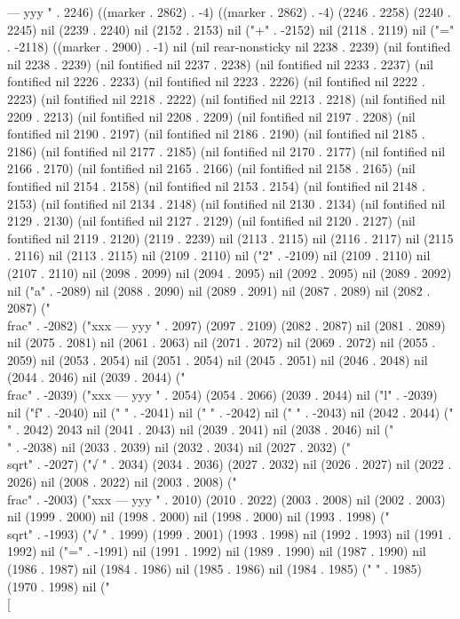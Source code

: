---
yyy
" . 2246) ((marker . 2862) . -4) ((marker . 2862) . -4) (2246 . 2258) (2240 . 2245) nil (2239 . 2240) nil (2152 . 2153) nil ("+" . -2152) nil (2118 . 2119) nil ("=" . -2118) ((marker . 2900) . -1) nil (nil rear-nonsticky nil 2238 . 2239) (nil fontified nil 2238 . 2239) (nil fontified nil 2237 . 2238) (nil fontified nil 2233 . 2237) (nil fontified nil 2226 . 2233) (nil fontified nil 2223 . 2226) (nil fontified nil 2222 . 2223) (nil fontified nil 2218 . 2222) (nil fontified nil 2213 . 2218) (nil fontified nil 2209 . 2213) (nil fontified nil 2208 . 2209) (nil fontified nil 2197 . 2208) (nil fontified nil 2190 . 2197) (nil fontified nil 2186 . 2190) (nil fontified nil 2185 . 2186) (nil fontified nil 2177 . 2185) (nil fontified nil 2170 . 2177) (nil fontified nil 2166 . 2170) (nil fontified nil 2165 . 2166) (nil fontified nil 2158 . 2165) (nil fontified nil 2154 . 2158) (nil fontified nil 2153 . 2154) (nil fontified nil 2148 . 2153) (nil fontified nil 2134 . 2148) (nil fontified nil 2130 . 2134) (nil fontified nil 2129 . 2130) (nil fontified nil 2127 . 2129) (nil fontified nil 2120 . 2127) (nil fontified nil 2119 . 2120) (2119 . 2239) nil (2113 . 2115) nil (2116 . 2117) nil (2115 . 2116) nil (2113 . 2115) nil (2109 . 2110) nil ("2" . -2109) nil (2109 . 2110) nil (2107 . 2110) nil (2098 . 2099) nil (2094 . 2095) nil (2092 . 2095) nil (2089 . 2092) nil ("a" . -2089) nil (2088 . 2090) nil (2089 . 2091) nil (2087 . 2089) nil (2082 . 2087) ("\\frac" . -2082) ("xxx
---
yyy
" . 2097) (2097 . 2109) (2082 . 2087) nil (2081 . 2089) nil (2075 . 2081) nil (2061 . 2063) nil (2071 . 2072) nil (2069 . 2072) nil (2055 . 2059) nil (2053 . 2054) nil (2051 . 2054) nil (2045 . 2051) nil (2046 . 2048) nil (2044 . 2046) nil (2039 . 2044) ("\\frac" . -2039) ("xxx
---
yyy
" . 2054) (2054 . 2066) (2039 . 2044) nil ("l" . -2039) nil ("f" . -2040) nil ("
" . -2041) nil ("
" . -2042) nil (" " . -2043) nil (2042 . 2044) (" " . 2042) 2043 nil (2041 . 2043) nil (2039 . 2041) nil (2038 . 2046) nil ("\\" . -2038) nil (2033 . 2039) nil (2032 . 2034) nil (2027 . 2032) ("\\sqrt" . -2027) ("√
" . 2034) (2034 . 2036) (2027 . 2032) nil (2026 . 2027) nil (2022 . 2026) nil (2008 . 2022) nil (2003 . 2008) ("\\frac" . -2003) ("xxx
---
yyy
" . 2010) (2010 . 2022) (2003 . 2008) nil (2002 . 2003) nil (1999 . 2000) nil (1998 . 2000) nil (1998 . 2000) nil (1993 . 1998) ("\\sqrt" . -1993) ("√
" . 1999) (1999 . 2001) (1993 . 1998) nil (1992 . 1993) nil (1991 . 1992) nil ("=" . -1991) nil (1991 . 1992) nil (1989 . 1990) nil (1987 . 1990) nil (1986 . 1987) nil (1984 . 1986) nil (1985 . 1986) nil (1984 . 1985) (" " . 1985) (1970 . 1998) nil ("\\[
 
